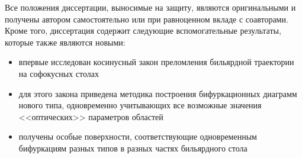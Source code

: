%
%
%



{\novelty} 
Все положения диссертации, выносимые на защиту, являются оригинальными и получены автором самостоятельно  или при равноценном вкладе с соавторами. Кроме того, диссертация содержит следующие вспомогательные результаты, которые также являются новыми:
  \begin{itemize}[beginpenalty=10000] %
  \item впервые исследован косинусный закон преломления бильярдной траектории на софокусных столах
  \item для этого закона приведена методика построения бифуркационных диаграмм нового типа, одновременно учитывающих все возможные значения <<оптических>> параметров областей
  \item получены особые поверхности, соответствующие одновременным бифуркациям разных типов в разных частях бильярдного стола
  \end{itemize}

